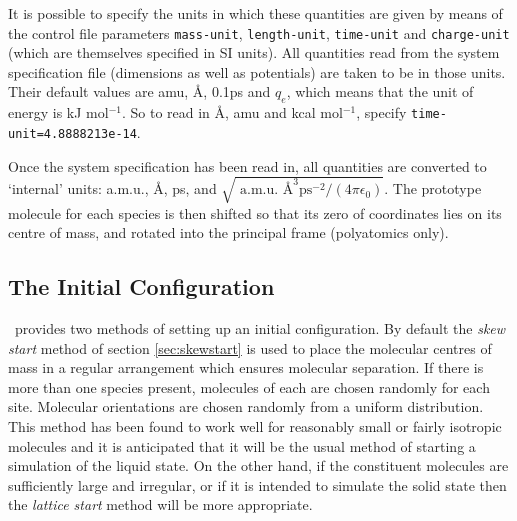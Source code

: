 It is possible to specify the units in which these quantities are given
by means of the control file parameters \verb'mass-unit',
\verb'length-unit', \verb'time-unit' and \verb'charge-unit' 
(which are themselves specified in SI units). All quantities read from
the system specification file (dimensions as well as potentials) are
taken to be in those units. Their default values are amu, \AA, 0.1ps
and $q_{e}$, which means that the unit of energy is kJ mol$^{-1}$.  So
to read in \AA, amu and kcal mol$^{-1}$, specify
\verb'time-unit=4.8888213e-14'.

Once the system specification has been read in, all quantities are
converted to `internal' units: a.m.u., \AA, ps, and $\sqrt{
\mbox{ a.m.u. \AA}^{3} \mbox{ps}^{-2}/(4 \pi \epsilon_{0})}$.
The prototype molecule for each species is then shifted so that its
zero of coordinates lies on its centre of mass, and rotated into the
principal frame (polyatomics only).

\subsection{The Initial Configuration}

\moldy\  provides two methods of setting up an initial configuration.
By default the {\em skew start} method of section \ref{sec:skewstart}
is used to place the molecular centres of mass in a regular
arrangement which ensures molecular separation.  If there is more than
one species present, molecules of each are chosen randomly for each
site.  Molecular orientations are chosen randomly from a uniform
distribution.  This method has been found to work well for reasonably
small or fairly isotropic molecules and it is anticipated that it will
be the usual method of starting a simulation of the liquid state.   On
the other hand, if the constituent molecules are sufficiently large
and irregular, or if it is intended to simulate the solid state then
the {\em lattice start} method will be more appropriate.


